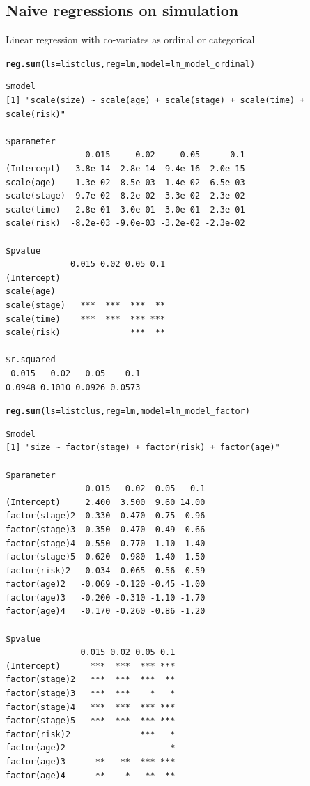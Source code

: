 \documentclass[]{revtex4}\usepackage[]{graphicx}\usepackage[]{color}
\makeatletter
\newcommand{\hlstd}[1]{\textcolor[rgb]{0.345,0.345,0.345}{#1}}%
\newcommand{\hlkwc}[1]{\textcolor[rgb]{0.333,0.667,0.333}{#1}}%
\newcommand{\hlkwd}[1]{\textcolor[rgb]{0.737,0.353,0.396}{\textbf{#1}}}%
\newenvironment{kframe}{%
 \def\at@end@of@kframe{}%
 \ifinner\ifhmode%
  \def\at@end@of@kframe{\end{minipage}}%
  \begin{minipage}{\columnwidth}%
 \fi\fi%
 \def\FrameCommand##1{\hskip\@totalleftmargin \hskip-\fboxsep
 \colorbox{shadecolor}{##1}\hskip-\fboxsep
     \hskip-\linewidth \hskip-\@totalleftmargin \hskip\columnwidth}%
 \MakeFramed {\advance\hsize-\width
   \@totalleftmargin\z@ \linewidth\hsize
   \@setminipage}}%
 {\par\unskip\endMakeFramed%
 \at@end@of@kframe}
\newenvironment{knitrout}{}{} %
\makeatother
\begin{document}
\subsection{Naive regressions on simulation}

Linear regression with co-variates as ordinal or categorical


\begin{knitrout}
\color{fgcolor}\begin{kframe}
\begin{alltt}
\hlkwd{reg.sum}\hlstd{(}\hlkwc{ls} \hlstd{= listclus,} \hlkwc{reg} \hlstd{= lm,} \hlkwc{model} \hlstd{= lm_model_ordinal)}
\end{alltt}
\begin{verbatim}
$model
[1] "scale(size) ~ scale(age) + scale(stage) + scale(time) + scale(risk)"

$parameter
                0.015     0.02     0.05      0.1
(Intercept)   3.8e-14 -2.8e-14 -9.4e-16  2.0e-15
scale(age)   -1.3e-02 -8.5e-03 -1.4e-02 -6.5e-03
scale(stage) -9.7e-02 -8.2e-02 -3.3e-02 -2.3e-02
scale(time)   2.8e-01  3.0e-01  3.0e-01  2.3e-01
scale(risk)  -8.2e-03 -9.0e-03 -3.2e-02 -2.3e-02

$pvalue
             0.015 0.02 0.05 0.1
(Intercept)                     
scale(age)                      
scale(stage)   ***  ***  ***  **
scale(time)    ***  ***  *** ***
scale(risk)              ***  **

$r.squared
 0.015   0.02   0.05    0.1 
0.0948 0.1010 0.0926 0.0573 
\end{verbatim}
\begin{alltt}
\hlkwd{reg.sum}\hlstd{(}\hlkwc{ls} \hlstd{= listclus,} \hlkwc{reg} \hlstd{= lm,} \hlkwc{model} \hlstd{= lm_model_factor)}
\end{alltt}
\begin{verbatim}
$model
[1] "size ~ factor(stage) + factor(risk) + factor(age)"

$parameter
                0.015   0.02  0.05   0.1
(Intercept)     2.400  3.500  9.60 14.00
factor(stage)2 -0.330 -0.470 -0.75 -0.96
factor(stage)3 -0.350 -0.470 -0.49 -0.66
factor(stage)4 -0.550 -0.770 -1.10 -1.40
factor(stage)5 -0.620 -0.980 -1.40 -1.50
factor(risk)2  -0.034 -0.065 -0.56 -0.59
factor(age)2   -0.069 -0.120 -0.45 -1.00
factor(age)3   -0.200 -0.310 -1.10 -1.70
factor(age)4   -0.170 -0.260 -0.86 -1.20

$pvalue
               0.015 0.02 0.05 0.1
(Intercept)      ***  ***  *** ***
factor(stage)2   ***  ***  ***  **
factor(stage)3   ***  ***    *   *
factor(stage)4   ***  ***  *** ***
factor(stage)5   ***  ***  *** ***
factor(risk)2              ***   *
factor(age)2                     *
factor(age)3      **   **  *** ***
factor(age)4      **    *   **  **


\end{verbatim}
\end{kframe}
\end{knitrout}
\end{document}
